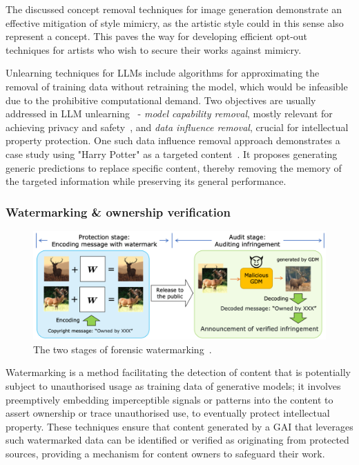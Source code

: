 \documentclass[conference,table]{IEEEtran}
\begin{document}
The discussed concept removal techniques for image generation demonstrate an effective mitigation of style mimicry, as the artistic style could in this sense also represent a concept. 
This paves the way for developing efficient opt-out techniques for artists who wish to secure their works against mimicry. 

Unlearning techniques for LLMs include algorithms for approximating the removal of training data without retraining the model, which would be infeasible due to the prohibitive computational demand. 
Two objectives are usually addressed in LLM unlearning~\cite{liu_rethinking_2024} - \textit{model capability removal}, mostly relevant for achieving privacy and safety~\cite{jang_knowledge_2022,wu_depn_2023,lu_quark_2022}, and \textit{data influence removal}, crucial for intellectual property protection.
One such data influence removal approach demonstrates a case study using "Harry Potter" as a targeted content~\cite{eldan_whos_2023}. 
It proposes generating generic predictions to replace specific content, thereby removing the memory of the targeted information while preserving its general performance. 

\subsubsection{Watermarking \& ownership verification} \label{sec:mitigation-watermarking}
\begin{figure}
    \centering
    \includegraphics[width=\linewidth]{figures/watermarking-stages.PNG}
    \caption{The two stages of forensic watermarking~\cite{cui_diffusionshield_2023}.}
    \label{fig:watermarking-stages}
\end{figure}
Watermarking is a method facilitating the detection of content that is potentially subject to unauthorised usage as training data of generative models; it involves preemptively embedding imperceptible signals or patterns into the content to assert ownership or trace unauthorised use, to eventually protect intellectual property. 
These techniques ensure that content generated by a GAI that leverages such watermarked data can be identified or verified as originating from protected sources, providing a mechanism for content owners to safeguard their work. 
\end{document}
